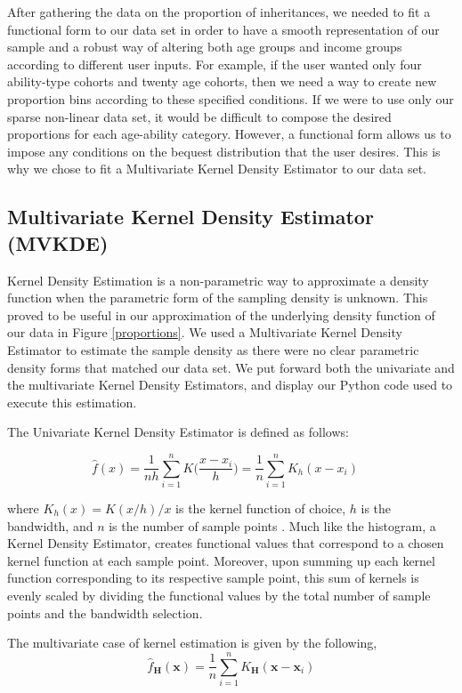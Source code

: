 \documentclass[letterpaper,12pt]{article}
\theoremstyle{definition}
\begin{document}
\begin{spacing}{1.5}
  After gathering the data on the proportion of inheritances, we needed to fit a functional form to our data set in order to have a smooth representation of our sample and a robust way of altering both age groups and income groups according to different user inputs. For example, if the user wanted only four ability-type cohorts and twenty age cohorts, then we need a way to create new proportion bins according to these specified conditions. If we were to use only our sparse non-linear data set, it would be difficult to compose the desired proportions for each age-ability category. However, a functional form allows us to impose any conditions on the bequest distribution that the user desires. This is why we chose to fit a Multivariate Kernel Density Estimator to our data set.


  \subsection{Multivariate Kernel Density Estimator (MVKDE)}\label{SecDistMVKDE}

    Kernel Density Estimation is a non-parametric way to approximate a density function when the parametric form of the sampling density is unknown. This proved to be useful in our approximation of the underlying density function of our data in Figure \ref{proportions}. We used a Multivariate Kernel Density Estimator to estimate the sample density as there were no clear parametric density forms that matched our data set. We put forward both the univariate and the multivariate Kernel Density Estimators, and display our Python code used to execute this estimation.

    The Univariate Kernel Density Estimator is defined as follows:

    \[\hat{f}(x) = \frac{1}{nh} \sum_{i=1}^n K\Big(\frac{x-x_i}{h}\Big)= \frac{1}{n}\sum_{i=1}^n K_h (x - x_i) \quad \]

    where $K_h(x) =  K(x/h)/x$ is the kernel function of choice, $h$ is the bandwidth, and $n$ is the number of sample points \citet{Scott:2015}. Much like the histogram, a Kernel Density Estimator, creates functional values that correspond to a chosen kernel function at each sample point. Moreover, upon summing up each kernel function corresponding to its respective sample point, this sum of kernels is evenly scaled by dividing the functional values by the total number of sample points and the bandwidth selection.

    The multivariate case of kernel estimation is given by the following,
    \[\hat{f}_\mathbf{H}(\mathbf{x})= \frac1n \sum_{i=1}^n K_\mathbf{H} (\mathbf{x} - \mathbf{x}_i)\]


\end{spacing}
\end{document}
